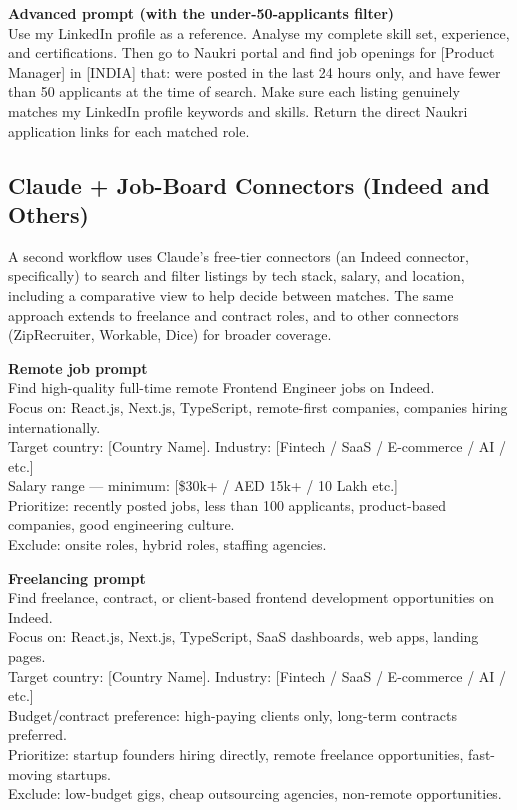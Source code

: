 \begin{template}
\textbf{Advanced prompt (with the under-50-applicants filter)}\\[4pt]
Use my LinkedIn profile as a reference. Analyse my complete skill set, experience, and certifications. Then go
to Naukri portal and find job openings for [Product Manager] in [INDIA] that: were posted in the last 24 hours
only, and have fewer than 50 applicants at the time of search. Make sure each listing genuinely matches my
LinkedIn profile keywords and skills. Return the direct Naukri application links for each matched role.
\end{template}

\subsection{Claude + Job-Board Connectors (Indeed and Others)}

A second workflow uses Claude's free-tier connectors (an Indeed connector, specifically) to search and filter
listings by tech stack, salary, and location, including a comparative view to help decide between matches. The
same approach extends to freelance and contract roles, and to other connectors (ZipRecruiter, Workable, Dice) for
broader coverage.

\begin{template}
\textbf{Remote job prompt}\\[4pt]
Find high-quality full-time remote Frontend Engineer jobs on Indeed.\\[2pt]
Focus on: React.js, Next.js, TypeScript, remote-first companies, companies hiring internationally.\\[2pt]
Target country: [Country Name]. Industry: [Fintech / SaaS / E-commerce / AI / etc.]\\[2pt]
Salary range — minimum: [\$30k+ / AED 15k+ / 10 Lakh etc.]\\[2pt]
Prioritize: recently posted jobs, less than 100 applicants, product-based companies, good engineering culture.\\[2pt]
Exclude: onsite roles, hybrid roles, staffing agencies.
\end{template}

\begin{template}
\textbf{Freelancing prompt}\\[4pt]
Find freelance, contract, or client-based frontend development opportunities on Indeed.\\[2pt]
Focus on: React.js, Next.js, TypeScript, SaaS dashboards, web apps, landing pages.\\[2pt]
Target country: [Country Name]. Industry: [Fintech / SaaS / E-commerce / AI / etc.]\\[2pt]
Budget/contract preference: high-paying clients only, long-term contracts preferred.\\[2pt]
Prioritize: startup founders hiring directly, remote freelance opportunities, fast-moving startups.\\[2pt]
Exclude: low-budget gigs, cheap outsourcing agencies, non-remote opportunities.
\end{template}

